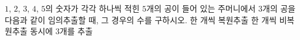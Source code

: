 $1$, $2$, $3$, $4$, $5$의 숫자가 각각 하나씩 적힌 $5$개의 공이 들어 있는 주머니에서 $3$개의 공을 다음과 같이 임의추출할 때, 그 경우의 수를 구하시오.
 한 개씩 복원추출
 한 개씩 비복원추출
 동시에 $3$개를 추출
